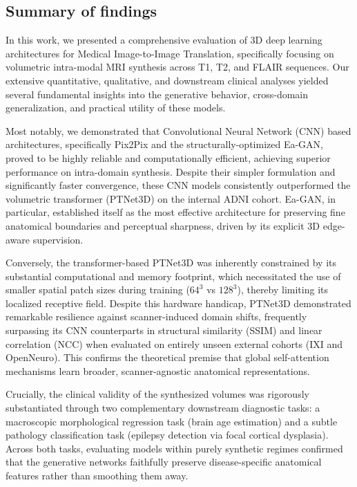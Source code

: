 \documentclass[11pt,a4paper]{article}
\begin{document}
\subsection{Summary of findings}
In this work, we presented a comprehensive evaluation of 3D deep learning architectures for Medical Image-to-Image Translation, specifically focusing on volumetric intra-modal MRI synthesis across T1, T2, and FLAIR sequences. Our extensive quantitative, qualitative, and downstream clinical analyses yielded several fundamental insights into the generative behavior, cross-domain generalization, and practical utility of these models.

Most notably, we demonstrated that Convolutional Neural Network (CNN) based architectures, specifically Pix2Pix and the structurally-optimized Ea-GAN, proved to be highly reliable and computationally efficient, achieving superior performance on intra-domain synthesis. Despite their simpler formulation and significantly faster convergence, these CNN models consistently outperformed the volumetric transformer (PTNet3D) on the internal ADNI cohort. Ea-GAN, in particular, established itself as the most effective architecture for preserving fine anatomical boundaries and perceptual sharpness, driven by its explicit 3D edge-aware supervision.

Conversely, the transformer-based PTNet3D was inherently constrained by its substantial computational and memory footprint, which necessitated the use of smaller spatial patch sizes during training ($64^3$ vs $128^3$), thereby limiting its localized receptive field. Despite this hardware handicap, PTNet3D demonstrated remarkable resilience against scanner-induced domain shifts, frequently surpassing its CNN counterparts in structural similarity (SSIM) and linear correlation (NCC) when evaluated on entirely unseen external cohorts (IXI and OpenNeuro). This confirms the theoretical premise that global self-attention mechanisms learn broader, scanner-agnostic anatomical representations.

Crucially, the clinical validity of the synthesized volumes was rigorously substantiated through two complementary downstream diagnostic tasks: a macroscopic morphological regression task (brain age estimation) and a subtle pathology classification task (epilepsy detection via focal cortical dysplasia). Across both tasks, evaluating models within purely synthetic regimes confirmed that the generative networks faithfully preserve disease-specific anatomical features rather than smoothing them away.
\end{document}
